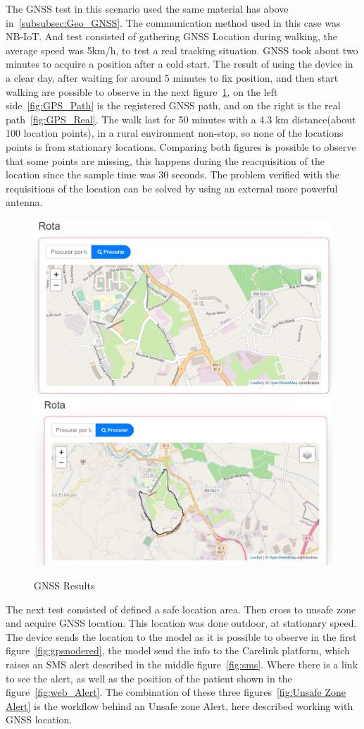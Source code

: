 The GNSS test in this scenario used the same material has above in~\ref{subsubsec:Geo_GNSS}. The communication method used in this case was NB-IoT. And test consisted of gathering GNSS Location during walking, the average speed was 5km/h, to test a real tracking situation. GNSS took about two minutes to acquire a position after a cold start.
The result of using the device in a clear day, after waiting for around 5 minutes to fix position, and then start walking are possible to observe in the next figure~\ref{fig:GNSS_Results}, on the left side~\ref{fig:GPS_Path} is the registered GNSS path, and on the right is the real path~\ref{fig:GPS_Real}.  The walk last for 50 minutes with a 4.3 km distance(about 100 location points), in a rural environment non-stop, so none of the locations points is from stationary locations. Comparing both figures is possible to observe that some points are missing, this happens during the reacquisition of the location since the sample time was 30 seconds. The problem verified with the requisitions of the location can be solved by using an external more powerful antenna.
\begin{figure}[htbp]
  \centering
    {\includegraphics[width=0.5\linewidth]{Chapters/Figures/GPS.JPG}}%
    {\includegraphics[width=0.5\linewidth]{Chapters/Figures/GPSREAL.JPG}}%
  \caption{GNSS Results}
  \label{fig:GNSS_Results}
\end{figure}

The next test consisted of defined a safe location area. Then cross to unsafe zone and acquire GNSS location. This location was done outdoor, at stationary speed. The device sends the location to the model as it is possible to observe in the first figure~\ref{fig:gpsnodered}, the model send the info to the Carelink platform, which raises an SMS alert described in the middle figure~\ref{fig:sms}. Where there is a link to see the alert, as well as the position of the patient shown in the figure~\ref{fig:web_Alert}. The combination of these three figures~\ref{fig:Unsafe Zone Alert} is the workflow behind an Unsafe zone Alert, here described working with GNSS location.\newline\newline

